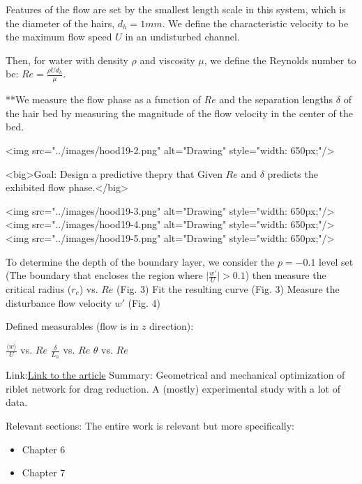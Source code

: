 \documentclass[preprint, letterpaper, nobibnotes, aps, superscriptaddress,prb]{revtex4-1}
\begin{document}
Features of the flow are set by the smallest length scale in this system, which is the diameter of the hairs, $d_h = 1 mm$. We define the characteristic velocity to be the maximum flow speed $U$ in an undisturbed channel. 

Then, for water with density $\rho$ and viscosity $\mu$, we define the Reynolds number to be: $Re = \frac{\rho U d_h}{\mu}$. 

**We measure the flow phase as a function of $Re$ and the separation lengths $\delta$ of the hair bed by measuring the magnitude of the flow velocity in the center of the bed.

\begin{figure}[H]
  \centering {}
  \caption{}\label{fig2}
\end{figure}

<img src="../images/hood19-2.png" alt="Drawing" style="width: 650px;"/>

<big>Goal: Design a predictive thepry that Given $Re$ and $\delta$ predicts the exhibited flow phase.</big>

<img src="../images/hood19-3.png" alt="Drawing" style="width: 650px;"/>
<img src="../images/hood19-4.png" alt="Drawing" style="width: 650px;"/>
<img src="../images/hood19-5.png" alt="Drawing" style="width: 650px;"/>

To determine the depth of the boundary layer, we consider the $p = −0.1$ level set (The boundary that encloses the region where $\vert\frac{w'}{U}\vert>0.1$)
then measure the critical radius ($r_c$) vs. $Re$ (Fig. 3)
Fit the resulting curve (Fig. 3)
Measure the disturbance flow velocity $w'$ (Fig. 4)

Defined measurables (flow is in $z$ direction):
    
$\frac{\langle w \rangle}{U}$ vs. $Re$
$\frac{\delta}{L_h}$ vs. $Re$
$\theta$ vs. $Re$

\clearpage

Link:\href{https://www.cambridge.org/core/services/aop-cambridge-core/content/view/16FACE9E75678D170A4ECCC7990C8158/S0022112096004673a.pdf/experiments_on_dragreducing_surfaces_and_their_optimization_with_an_adjustable_geometry.pdf}{Link to the article}
Summary: Geometrical and mechanical optimization of riblet network for drag reduction. A (mostly) experimental study with a lot of data. 

Relevant sections: The entire work is relevant but more specifically:
\begin{itemize}
	\item Chapter 6
	\item Chapter 7
\end{itemize}
\end{document}
